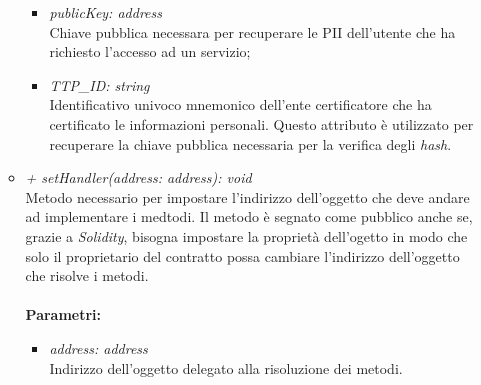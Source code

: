 \begin{itemize}
\begin{itemize}
		\begin{itemize}
			\item \textit{publicKey: address}\\
			Chiave pubblica necessara per recuperare le \gls{PII} dell'utente che ha richiesto l'accesso ad un servizio;
			\item \textit{TTP\_ID: string}\\
			Identificativo univoco mnemonico dell'ente certificatore che ha certificato le informazioni personali. Questo attributo è utilizzato per recuperare la chiave pubblica necessaria per la verifica degli \textit{hash}.
		\end{itemize}
		\item \textit{+ setHandler(address: address): void}\\
		Metodo necessario per impostare l'indirizzo dell'oggetto che deve andare ad implementare i medtodi. Il metodo è segnato come pubblico anche se, grazie a \textit{Solidity}, bisogna impostare la proprietà dell'ogetto in modo che solo il proprietario del contratto possa cambiare l'indirizzo dell'oggetto che risolve i metodi.\\\\
		\textbf{Parametri:}
		\begin{itemize}
			\item \textit{address: address}\\
			Indirizzo dell'oggetto delegato alla risoluzione dei metodi.
		\end{itemize}		
	\end{itemize}
\end{itemize}
